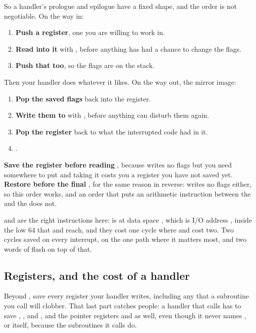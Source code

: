 So a handler's prologue and epilogue have a fixed shape, and the order is not negotiable. On the
way in:
\begin{enumerate}
  \item \textbf{Push a register}, one you are willing to work in.
  \item \textbf{Read  into it} with , before anything has had a chance to
    change the flags.
  \item \textbf{Push that too}, so the flags are on the stack.
\end{enumerate}
Then your handler does whatever it likes. On the way out, the mirror image:
\begin{enumerate}[resume]
  \item \textbf{Pop the saved flags} back into the register.
  \item \textbf{Write them to } with , before anything can disturb them
    again.
  \item \textbf{Pop the register} back to what the interrupted code had in it.
  \item \textbf{}.
\end{enumerate}

\textbf{Save the register before reading }, because  writes no flags but you
need somewhere to put  and taking it costs you a register you have not saved yet.
\textbf{Restore  before the final }, for the same reason in reverse:
 writes no flags either, so this order works, and an order that puts an arithmetic
instruction between the  and the  does not.

 and  are the right instructions here:  is at data space
, which is I/O address , inside the low 64 that  and 
reach, and they cost one cycle where  and  cost two. Two cycles saved on every
interrupt, on the one path where it matters most, and two words of flash on top of that.

\subsection{Registers, and the cost of a handler}
\label{c3:sec:cost}
Beyond , save every register your handler writes, including any that a subroutine you
call will clobber. That last part catches people: a handler that calls  has to
save , ,  and , and the pointer registers  and
 as well, even though it never names ,  or  itself, because the
subroutines it calls do.

